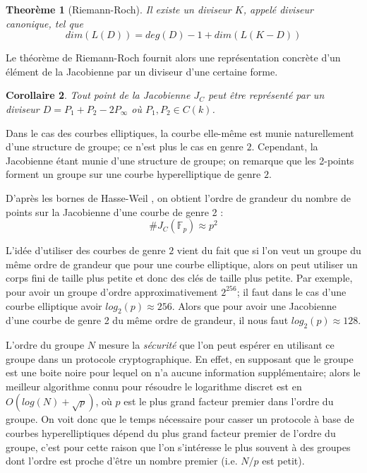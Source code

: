 \documentclass[a4paper]{article}
\newtheorem{theoreme}{Theorème}[section]
\newtheorem{corollaire}[theoreme]{Corollaire}
\theoremstyle{definition}
\theoremstyle{remark}
\numberwithin{equation}{section}
\begin{document}
\begin{theoreme}[Riemann-Roch]
Il existe un diviseur $K$, appelé diviseur canonique, tel que
$$dim (L(D)) = deg(D) - 1 + dim (L(K - D))$$
\end{theoreme}

Le théorème de Riemann-Roch fournit alors une représentation concrète d'un élément de la Jacobienne par un diviseur d'une certaine forme. 

\begin{corollaire}
\label{div_red}
Tout point de la Jacobienne $J_C$ peut être représenté par un diviseur $D = P_1 + P_2 - 2P_\infty$ où $P_1,P_2 \in C(k)$.
\end{corollaire}

Dans le cas des courbes elliptiques, la courbe elle-même est munie naturellement d'une structure de groupe; ce n'est plus le cas en genre $2$. Cependant, la Jacobienne étant munie d'une structure de groupe; on remarque que les 2-points forment un groupe sur une courbe hyperelliptique de genre $2$.

D'après les bornes de Hasse-Weil \citep{weil}, on obtient l'ordre de grandeur du nombre de points sur la Jacobienne d'une courbe de genre 2 :
$$\#J_C(\mathbb{F}_p) \approx p^2$$

L'idée d'utiliser des courbes de genre $2$ vient du fait que si l'on veut un groupe du même ordre de grandeur que pour une courbe elliptique, alors on peut utiliser un corps fini de taille plus petite et donc des clés de taille plus petite. Par exemple, pour avoir un groupe d'ordre approximativement $2^{256}$; il faut dans le cas d'une courbe elliptique avoir $log_2(p) \approx 256$. Alors que pour avoir une Jacobienne d'une courbe de genre 2 du même ordre de grandeur, il nous faut $log_2(p) \approx 128$.

L'ordre du groupe $N$ mesure la \emph{sécurité} que l'on peut espérer en utilisant ce groupe dans un protocole cryptographique. En effet, en supposant que le groupe est une boite noire pour lequel on n'a aucune information supplémentaire; alors le meilleur algorithme connu pour résoudre le logarithme discret est en $O(log(N)+\sqrt{p})$, où $p$ est le plus grand facteur premier dans l'ordre du groupe. On voit donc que le temps nécessaire pour casser un protocole à base de courbes hyperelliptiques dépend du plus grand facteur premier de l'ordre du groupe, c'est pour cette raison que l'on s'intéresse le plus souvent à des groupes dont l'ordre est proche d'être un nombre premier (i.e. $N/p$ est petit).
 
\end{document}
